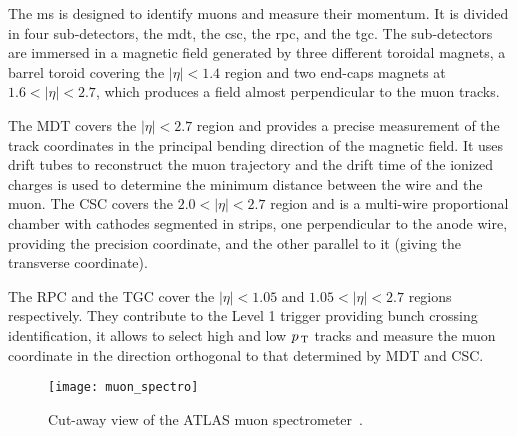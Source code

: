 The \gls{ms} is designed to identify muons and measure their momentum. It is
divided in four sub-detectors, the \gls{mdt}, the \gls{csc}, the \gls{rpc}, and
the \gls{tgc}. The sub-detectors are immersed in a magnetic field generated by
three different toroidal magnets, a barrel toroid covering the $|\eta| < 1.4$
region and two end-caps magnets at $1.6 < |\eta| < 2.7$, which produces a field
almost perpendicular to the muon tracks.

The MDT covers the $|\eta| < 2.7$ region and provides a precise measurement of
the track coordinates in the principal bending direction of the magnetic
field. It uses drift tubes to reconstruct the muon trajectory and the drift time
of the ionized charges is used to determine the minimum distance between the
wire and the muon. The CSC covers the $2.0 < |\eta| < 2.7$ region and is a
multi-wire proportional chamber with cathodes segmented in strips, one
perpendicular to the anode wire, providing the precision coordinate, and the
other parallel to it (giving the transverse coordinate).


The RPC and the TGC cover the $|\eta| < 1.05$ and $1.05 < |\eta| < 2.7$ regions
respectively. They contribute to the Level 1 trigger providing bunch crossing
identification, it allows to select high and low $p_\mathrm{\, T}$ tracks and measure the
muon coordinate in the direction orthogonal to that determined by MDT and CSC\@.

\begin{figure}[!h]
  \centering
    \texttt{[image: muon\_spectro]}
    \caption{Cut-away view of the ATLAS muon spectrometer~\cite{ATLASPaper}.}
    \label{fig:muon_spectro}
\end{figure}
